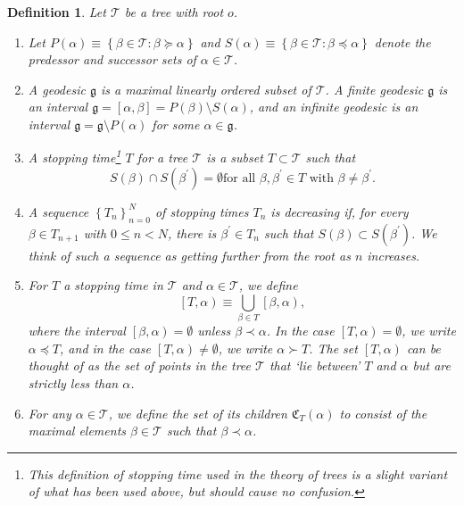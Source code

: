 \documentclass{amsart}%
\theoremstyle{plain}
\newtheorem{definition}[theorem]{Definition}
\numberwithin{equation}{section}
\begin{document}
\begin{definition}
Let $\mathcal{T}$ be a tree with root $o$.

\begin{enumerate}
\item Let $P\left(  \alpha\right)  \equiv\left\{  \beta\in\mathcal{T}%
:\beta\succeq\alpha\right\}  $ and $S\left(  \alpha\right)  \equiv\left\{
\beta\in\mathcal{T}:\beta\preceq\alpha\right\}  $ denote the predessor and
successor sets of $\alpha\in\mathcal{T}$.

\item A \emph{geodesic} $\mathfrak{g}$ is a maximal linearly ordered subset of
$\mathcal{T}$. A finite geodesic $\mathfrak{g}$ is an interval $\mathfrak{g}%
=\left[  \alpha,\beta\right]  =P\left(  \beta\right)  \setminus S\left(
\alpha\right)  $, and an infinite geodesic is an interval $\mathfrak{g}%
=\mathfrak{g}\setminus P\left(  \alpha\right)  $ for some $\alpha
\in\mathfrak{g}$.

\item A \emph{stopping time}\footnote{This definition of stopping time used in
the theory of trees is a slight variant of what has been used above, but
should cause no confusion.} $T$ for a tree $\mathcal{T}$ is a subset
$T\subset\mathcal{T}$ such that
\[
S\left(  \beta\right)  \cap S\left(  \beta^{\prime}\right)  =\emptyset\text{
for all }\beta,\beta^{\prime}\in T\text{ with }\beta\neq\beta^{\prime}.
\]


\item A sequence $\left\{  T_{n}\right\}  _{n=0}^{N}$ of stopping times
$T_{n}$ is \emph{decreasing} if, for every $\beta\in T_{n+1}$ with $0\leq
n<N$, there is $\beta^{\prime}\in T_{n}$ such that $S\left(  \beta\right)
\subset S\left(  \beta^{\prime}\right)  $. We think of such a sequence as
getting further from the root as $n$ increases.

\item For $T$ a stopping time in $\mathcal{T}$ and $\alpha\in\mathcal{T}$, we
define
\[
\left[  T,\alpha\right)  \equiv\bigcup_{\beta\in T}\left[  \beta
,\alpha\right)  ,
\]
where the interval $\left[  \beta,\alpha\right)  =\emptyset$ unless
$\beta\prec\alpha$. In the case $\left[  T,\alpha\right)  =\emptyset$, we
write $\alpha\preceq T$, and in the case $\left[  T,\alpha\right)
\not =\emptyset$, we write $\alpha\succ T$. The set $\left[  T,\alpha\right)
$ can be thought of as the set of points in the tree $\mathcal{T}$ that `lie
between' $T$ and $\alpha$ but are strictly less than $\alpha$.

\item For any $\alpha\in\mathcal{T}$, we define the set of its \emph{children}
$\mathfrak{C}_{T}\left(  \alpha\right)  $ to consist of the \emph{maximal}
elements $\beta\in\mathcal{T}$ such that $\beta\prec\alpha$.
\end{enumerate}
\end{definition}
\end{document}
